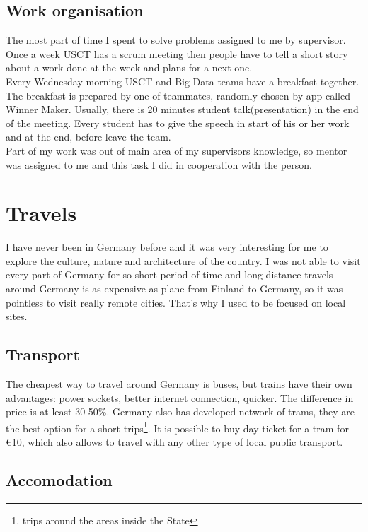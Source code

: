 \documentclass[english]{article}
\begin{document}
\subsection{Work organisation}

The most part of time I spent to solve problems assigned to me by supervisor. Once a week USCT has a scrum meeting then people have to tell a short story about a work done at the week and plans for a next one.\\

Every Wednesday morning USCT and Big Data teams have a breakfast together. The breakfast is prepared by one of teammates, randomly chosen by app called Winner Maker. Usually, there is 20 minutes student talk(presentation) in the end of the meeting. Every student has to give the speech in start of his or her work and at the end, before leave the team.\\

Part of my work was out of main area of my supervisors knowledge, so mentor was assigned to me and this task I did in cooperation with the person.

\section{Travels}

I have never been in Germany before and it was very interesting for me to explore the culture, nature and architecture of the country. I was not able to visit every part of Germany for so short period of time and long distance travels around Germany is as expensive as plane from Finland to Germany, so it was pointless to visit really remote cities. That's why I used to be focused on local sites.

\subsection{Transport}

The cheapest way to travel around Germany is buses, but trains have their own advantages: power sockets, better internet connection, quicker. The difference in price is at least 30-50\%. Germany also has developed network of trams, they are the best option for a short trips\footnote{trips around the areas inside the State}. It is possible to buy day ticket for a tram for \euro10, which also allows to travel with any other type of local public transport.

\subsection{Accomodation}
\end{document}
